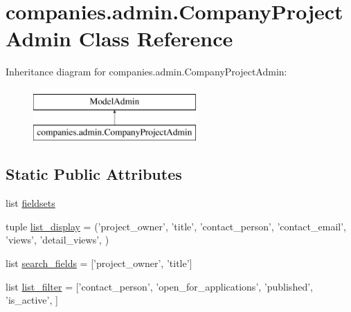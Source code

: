\hypertarget{classcompanies_1_1admin_1_1_company_project_admin}{\section{companies.\-admin.\-Company\-Project\-Admin Class Reference}
\label{classcompanies_1_1admin_1_1_company_project_admin}
}
Inheritance diagram for companies.\-admin.\-Company\-Project\-Admin\-:\begin{figure}[H]
\begin{center}
\leavevmode
\includegraphics[height=2.000000cm]{classcompanies_1_1admin_1_1_company_project_admin}
\end{center}
\end{figure}
\subsection*{Static Public Attributes}
\begin{DoxyCompactItemize}
\item 
list \hyperlink{classcompanies_1_1admin_1_1_company_project_admin_aac14acbc97d6a3bff4a30ca24b0730b7}{fieldsets}
\item 
tuple \hyperlink{classcompanies_1_1admin_1_1_company_project_admin_a51df8a0e3c3c014323e83d2805eeac46}{list\-\_\-display} = ('project\-\_\-owner', 'title', 'contact\-\_\-person', 'contact\-\_\-email', 'views', 'detail\-\_\-views', )
\item 
list \hyperlink{classcompanies_1_1admin_1_1_company_project_admin_a145d6b8ce6c943fb25efbb950ea4d79b}{search\-\_\-fields} = \mbox{[}'project\-\_\-owner', 'title'\mbox{]}
\item 
list \hyperlink{classcompanies_1_1admin_1_1_company_project_admin_a715870590cfb29621cbe719e200deba8}{list\-\_\-filter} = \mbox{[}'contact\-\_\-person', 'open\-\_\-for\-\_\-applications', 'published', 'is\-\_\-active', \mbox{]}
\end{DoxyCompactItemize}


